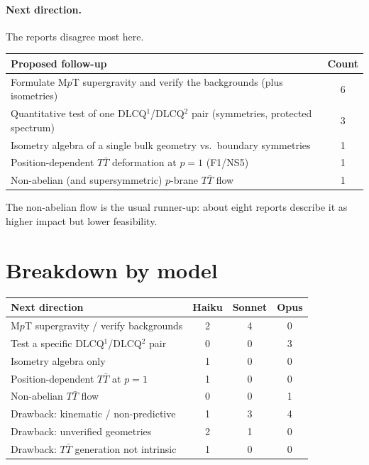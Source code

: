 \documentclass[11pt]{article}
\begin{document}
\paragraph{Next direction.} The reports disagree most here.
\begin{center}
\begin{tabular}{p{}c}
\toprule
Proposed follow-up & Count\\
\midrule
Formulate M$p$T supergravity and verify the backgrounds (plus isometries) & 6\\
Quantitative test of one DLCQ$^1$/DLCQ$^2$ pair (symmetries, protected spectrum) & 3\\
Isometry algebra of a single bulk geometry vs.\ boundary symmetries & 1\\
Position-dependent $T\bar T$ deformation at $p=1$ (F1/NS5) & 1\\
Non-abelian (and supersymmetric) $p$-brane $T\bar T$ flow & 1\\
\bottomrule
\end{tabular}
\end{center}
The non-abelian flow is the usual runner-up: about eight reports describe it as higher impact but lower feasibility.

\section*{Breakdown by model}

\begin{center}
\begin{tabular}{lccc}
\toprule
Next direction & Haiku & Sonnet & Opus\\
\midrule
M$p$T supergravity / verify backgrounds & 2 & 4 & 0\\
Test a specific DLCQ$^1$/DLCQ$^2$ pair & 0 & 0 & 3\\
Isometry algebra only & 1 & 0 & 0\\
Position-dependent $T\bar T$ at $p=1$ & 1 & 0 & 0\\
Non-abelian $T\bar T$ flow & 0 & 0 & 1\\
\midrule
Drawback: kinematic / non-predictive & 1 & 3 & 4\\
Drawback: unverified geometries & 2 & 1 & 0\\
Drawback: $T\bar T$ generation not intrinsic & 1 & 0 & 0\\
\bottomrule
\end{tabular}
\end{center}
\end{document}
